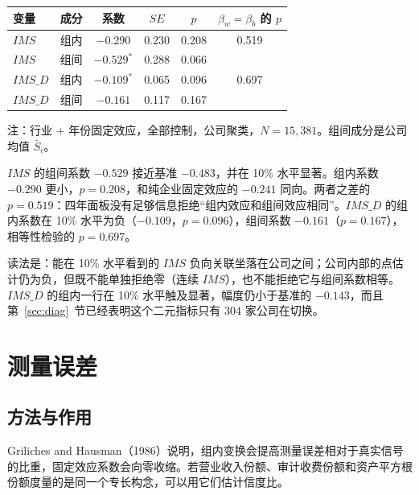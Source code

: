 \documentclass[11pt]{article}
\begin{document}
\begin{center}
\begin{threeparttable}
\caption{Mundlak 分解}
\label{tab:mundlak}
\begin{tabular}{llcccc}
\toprule
变量 & 成分 & 系数 & \(SE\) & \(p\) & \(\beta_w=\beta_b\) 的 \(p\) \\
\midrule
\(IMS\) & 组内 & \(-0.290\) & 0.230 & 0.208 & 0.519 \\
\(IMS\) & 组间 & \(-0.529^{*}\) & 0.288 & 0.066 & \\
\(IMS\_D\) & 组内 & \(-0.109^{*}\) & 0.065 & 0.096 & 0.697 \\
\(IMS\_D\) & 组间 & \(-0.161\) & 0.117 & 0.167 & \\
\bottomrule
\end{tabular}
\begin{tablenotes}\footnotesize
\item 注：行业 + 年份固定效应，全部控制，公司聚类，\(N=15{,}381\)。组间成分是公司均值 \(\bar S_i\)。
\end{tablenotes}
\end{threeparttable}
\end{center}

\(IMS\) 的组间系数 \(-0.529\) 接近基准 \(-0.483\)，并在 10\% 水平显著。组内系数 \(-0.290\) 更小，\(p=0.208\)，和纯企业固定效应的 \(-0.241\) 同向。两者之差的 \(p=0.519\)：四年面板没有足够信息拒绝``组内效应和组间效应相同''。\(IMS\_D\) 的组内系数在 10\% 水平为负（\(-0.109\)，\(p=0.096\)），组间系数 \(-0.161\)（\(p=0.167\)），相等性检验的 \(p=0.697\)。

读法是：能在 10\% 水平看到的 \(IMS\) 负向关联坐落在公司之间；公司内部的点估计仍为负，但既不能单独拒绝零（连续 \(IMS\)），也不能拒绝它与组间系数相等。\(IMS\_D\) 的组内一行在 10\% 水平触及显著，幅度仍小于基准的 \(-0.143\)，而且第~\ref{sec:diag}~节已经表明这个二元指标只有 304 家公司在切换。

\section{测量误差}
\label{sec:eiv}

\subsection{方法与作用}

Griliches and Hausman（1986）说明，组内变换会提高测量误差相对于真实信号的比重，固定效应系数会向零收缩。若营业收入份额、审计收费份额和资产平方根份额度量的是同一个专长构念，可以用它们估计信度比。
\end{document}
